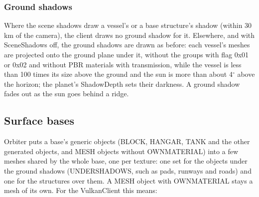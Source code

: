 \documentclass[Orbiter Developer Manual.tex]{subfiles}
\begin{document}
\begin{sloppypar}
\subsubsection{Ground shadows}
Where the scene shadows draw a vessel's or a base structure's shadow (within 30 km of the camera), the client draws no ground shadow for it. Elsewhere, and with SceneShadows off, the ground shadows are drawn as before: each vessel's meshes are projected onto the ground plane under it, without the groups with flag 0x01 or 0x02 and without PBR materials with transmission, while the vessel is less than 100 times its size above the ground and the sun is more than about 4$^{\circ}$ above the horizon; the planet's ShadowDepth sets their darkness. A ground shadow fades out as the sun goes behind a ridge.


\subsection{Surface bases}
\label{ssec:vk_bases}
Orbiter puts a base's generic objects (BLOCK, HANGAR, TANK and the other generated objects, and MESH objects without OWNMATERIAL) into a few meshes shared by the whole base, one per texture: one set for the objects under the ground shadows (UNDERSHADOWS, such as pads, runways and roads) and one for the structures over them. A MESH object with OWNMATERIAL stays a mesh of its own. For the VulkanClient this means:


\end{sloppypar}
\end{document}
